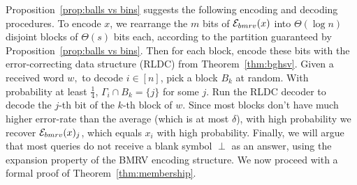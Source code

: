 \documentclass[11pt,english]{article}
\theoremstyle{definition}
\theoremstyle{remark}
\newcommand{\E}{{\cal E}}
\begin{document}
Proposition~\ref{prop:balls vs bins} suggests the following encoding
and decoding procedures. To encode $x$, we rearrange the $m$ bits
of $\E_{bmrv}(x)$ into $\Theta(\log n)$ disjoint blocks of $\Theta(s)$
bits each, according to the partition guaranteed by Proposition~\ref{prop:balls vs bins}.
Then for each block, encode these bits with the error-correcting
data structure (RLDC) from Theorem~\ref{thm:bghsv}. Given a received word $w,$ to decode $i\in[n]$, pick a block $B_{k}$
at random. With probability at least $\frac{1}{4}$, $\Gamma_{i}\cap B_{k}=\{j\}$
for some $j$. Run the RLDC decoder to decode the $j$-th bit of the
$k$-th block of $w$. Since most blocks don't have much higher error-rate
than the average (which is at most $\delta$), with high probability
we recover $\E_{bmrv}(x)_{j}$, which equals $x_{i}$ with high probability.
Finally, we will argue that most queries do not receive a blank symbol
$\perp$ as an answer, using the expansion property
of the BMRV encoding structure. We now proceed with a formal proof
of Theorem~\ref{thm:membership}.
\end{document}
